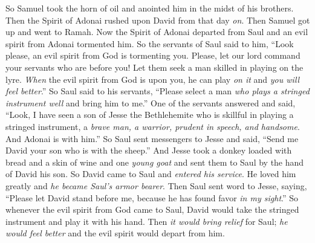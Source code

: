 \begin{biblechapter}
\verse So Samuel took the horn of oil and anointed him in the midst of his brothers. Then the Spirit of Adonai rushed upon David from that day \textit{on}. Then Samuel got up and went to Ramah.
 Now the Spirit of Adonai departed from Saul and an evil spirit from Adonai tormented him.
\verse So the servants of Saul said to him, “Look please, an evil spirit from God is tormenting you.
\verse Please, let our lord command your servants who are before you! Let them seek a man skilled in playing on the lyre. \textit{When} the evil spirit from God is upon you, he can play \textit{on it} and \textit{you will feel better}.”
\verse So Saul said to his servants, “Please select a man \textit{who plays a stringed instrument well} and bring him to me.”
\verse One of the servants answered and said, “Look, I have seen a son of Jesse the Bethlehemite who is skillful in playing a stringed instrument, a \textit{brave man, a warrior, prudent in speech, and handsome}. And Adonai is with him.”
\verse So Saul sent messengers to Jesse and said, “Send me David your son who is with the sheep.”
\verse And Jesse took a donkey loaded with bread and a skin of wine and one \textit{young goat} and sent them to Saul by the hand of David his son.
\verse So David came to Saul and \textit{entered his service}. He loved him greatly and \textit{he became Saul’s armor bearer}.
\verse Then Saul sent word to Jesse, saying, “Please let David stand before me, because he has found favor \textit{in my sight}.”
\verse So whenever the evil spirit from God came to Saul, David would take the stringed instrument and play it with his hand. Then \textit{it would bring relief} for Saul; \textit{he would feel better} and the evil spirit would depart from him.
\end{biblechapter}

